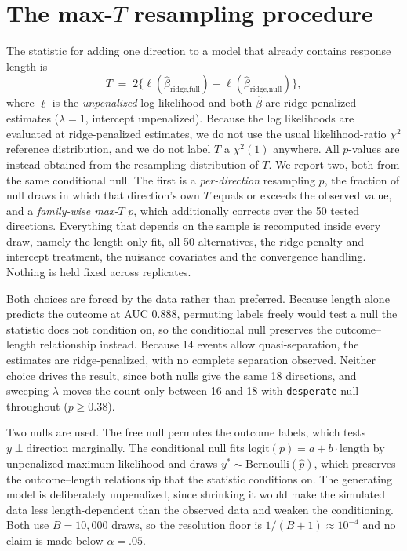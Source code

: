 \section{The max-$T$ resampling procedure}
\label{app:maxt}

The statistic for adding one direction to a model that already contains response
length is
\[
T \;=\; 2\bigl\{\ell(\hat\beta_{\text{ridge,full}}) - \ell(\hat\beta_{\text{ridge,null}})\bigr\},
\]
where $\ell$ is the \emph{unpenalized} log-likelihood and both $\hat\beta$ are
ridge-penalized estimates ($\lambda = 1$, intercept unpenalized). Because the log
likelihoods are evaluated at ridge-penalized estimates, we do not use the usual
likelihood-ratio $\chi^2$ reference distribution, and we do not label $T$ a
$\chi^2(1)$ anywhere. All $p$-values are instead obtained from the resampling
distribution of $T$. We report two, both from the same conditional
null. The first is a \emph{per-direction} resampling $p$, the fraction of null draws in which
that direction's own $T$ equals or exceeds the observed value, and a
\emph{family-wise max-$T$} $p$, which additionally corrects over the 50 tested
directions. Everything that
depends on the sample is recomputed inside every draw, namely the length-only fit, all 50
alternatives, the ridge penalty and intercept treatment, the nuisance covariates and
the convergence handling. Nothing is held fixed across replicates.

Both choices are forced by the data rather than preferred. Because length alone
predicts the outcome at AUC $0.888$, permuting labels freely would test a null the
statistic does not condition on, so the conditional null preserves the
outcome--length relationship instead. Because 14 events allow quasi-separation, the
estimates are ridge-penalized, with no complete separation observed. Neither
choice drives the result, since both nulls give the same 18 directions, and sweeping
$\lambda$ moves the count only between 16 and 18 with \texttt{desperate} null
throughout ($p \ge 0.38$).

Two nulls are used. The free null permutes the outcome labels, which tests
$y \perp \text{direction}$ marginally. The conditional null fits
$\text{logit}(p) = a + b \cdot \text{length}$ by unpenalized maximum likelihood and
draws $y^* \sim \text{Bernoulli}(\hat p)$, which preserves the outcome--length
relationship that the statistic conditions on. The generating model is deliberately
unpenalized, since shrinking it would make the simulated data less length-dependent
than the observed data and weaken the conditioning. Both use $B = 10{,}000$ draws,
so the resolution floor is $1/(B+1) \approx 10^{-4}$ and no claim is made below
$\alpha = .05$.

